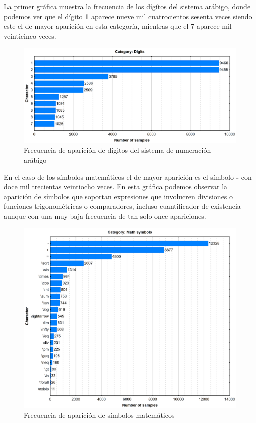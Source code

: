 La primer gráfica muestra la frecuencia de los dígítos del sistema arábigo, donde podemos ver que el dígito \textbf{1} aparece nueve mil cuatrocientos sesenta veces siendo este el de mayor aparición en esta categoría, mientras que el 7 aparece mil veinticinco veces.
\begin{figure}[H]
	\centering
	\includegraphics[width=1\textwidth]{capitulo3/imgs/digits_distribution.png}
	\caption{Frecuencia de aparición de dígitos del sistema de numeración arábigo}
	\label{fig:DigDist}
\end{figure}
\newpage
En el caso de los símbolos matemáticos el de mayor aparición es el símbolo \textbf{-} con doce mil trecientas veintiocho veces. En esta gráfica podemos observar la aparición de símbolos que soportan expresiones que involucren divisiones o funciones trigonométricas o comparadores, incluso cuantificador de existencia aunque con una muy baja frecuencia de tan solo once apariciones.
\begin{figure}[H]
	\centering
	\includegraphics[width=1\textwidth]{capitulo3/imgs/math_symbols_distribution.png}
	\caption{Frecuencia de aparición de símbolos matemáticos}
	\label{fig:MathSymbols}
\end{figure}
\newpage

